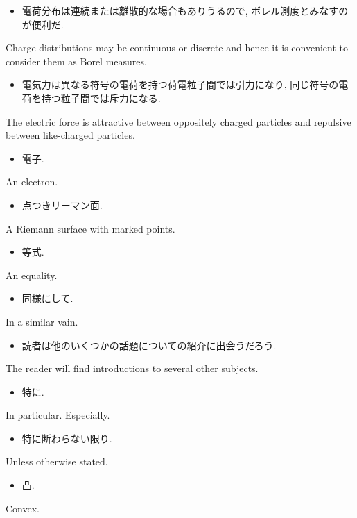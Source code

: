 \documentclass[openany, a4paper, oneside]{jsbook}
\begin{document}
\begin{itemize}
\item 電荷分布は連続または離散的な場合もありうるので, ボレル測度とみなすのが便利だ. \cite{LiebSeiringer1}
\end{itemize}
Charge distributions may be continuous or discrete and hence it is convenient to consider
them as Borel measures.

\begin{itemize}
\item 電気力は異なる符号の電荷を持つ荷電粒子間では引力になり, 同じ符号の電荷を持つ粒子間では斥力になる. \cite{LiebSeiringer1}
\end{itemize}
The electric force is attractive between oppositely charged particles and repulsive between like-charged particles.

\begin{itemize}
\item 電子.
\end{itemize}
An electron.

\begin{itemize}
\item 点つきリーマン面.
\end{itemize}
A Riemann surface with marked points.

\begin{itemize}
\item 等式.
\end{itemize}
An equality.

\begin{itemize}
\item 同様にして.
\end{itemize}
In a similar vain.

\begin{itemize}
\item 読者は他のいくつかの話題についての紹介に出会うだろう.  \cite{CharlesWeibel1}
\end{itemize}
The reader will find introductions to several other subjects.

\begin{itemize}
\item 特に.
\end{itemize}
In particular. Especially.

\begin{itemize}
\item 特に断わらない限り.
\end{itemize}
Unless otherwise stated.

\begin{itemize}
\item 凸.
\end{itemize}
Convex.
\end{document}

